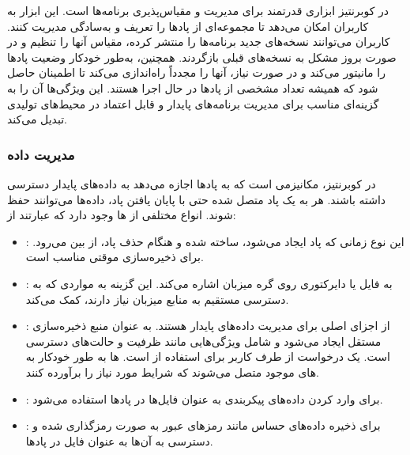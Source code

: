 در کوبرنتیز ابزاری قدرتمند برای مدیریت و مقیاس‌پذیری برنامه‌ها است. این ابزار به کاربران امکان می‌دهد تا مجموعه‌ای از پادها را تعریف و به‌سادگی مدیریت کنند. کاربران می‌توانند نسخه‌های جدید برنامه‌ها را منتشر کرده، مقیاس آنها را تنظیم و در صورت بروز مشکل به نسخه‌های قبلی بازگردند. همچنین، به‌طور خودکار وضعیت پادها را مانیتور می‌کند و در صورت نیاز، آنها را مجدداً راه‌اندازی می‌کند تا اطمینان حاصل شود که همیشه تعداد مشخصی از پادها در حال اجرا هستند. این ویژگی‌ها آن را به گزینه‌ای مناسب برای مدیریت برنامه‌های پایدار و قابل اعتماد در محیط‌های تولیدی تبدیل می‌کند.

\subsubsection{مدیریت داده}
در کوبرنتیز،‌  مکانیزمی است که به پادها اجازه می‌دهد به داده‌های پایدار دسترسی داشته باشند. هر  به یک پاد متصل شده  حتی با پایان یافتن پاد، داده‌ها می‌توانند حفظ شوند. انواع مختلفی از ها وجود دارد که عبارتند از:
\begin{itemize}
	\item 
	:
	 این نوع  زمانی که پاد ایجاد می‌شود، ساخته شده و هنگام حذف پاد، از بین می‌رود. برای ذخیره‌سازی موقتی مناسب است.
	\item
	: 
	به فایل یا دایرکتوری روی گره میزبان اشاره می‌کند. این گزینه به مواردی که به دسترسی مستقیم به منابع میزبان نیاز دارند، کمک می‌کند.
	\item 
	:
	از اجزای اصلی برای مدیریت داده‌های پایدار هستند.  به عنوان منبع ذخیره‌سازی مستقل ایجاد می‌شود و شامل ویژگی‌هایی مانند ظرفیت و حالت‌های دسترسی است.  یک درخواست از طرف کاربر برای استفاده از  است. ها به طور خودکار به های موجود متصل می‌شوند که شرایط مورد نیاز را برآورده کنند.
	\item 
	:
	برای وارد کردن داده‌های پیکربندی به عنوان فایل‌ها در پادها استفاده می‌شود.
	\item 
	:
	برای ذخیره داده‌های حساس مانند رمزهای عبور به صورت رمزگذاری شده و دسترسی به آن‌ها به عنوان فایل در پادها.
\end{itemize}





























